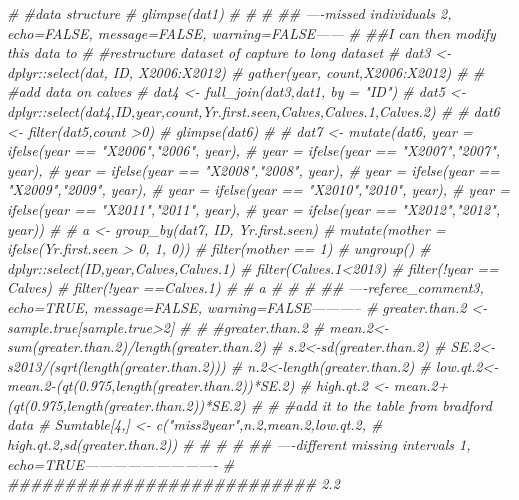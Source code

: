 \documentclass[]{book}
\newenvironment{Shaded}{\begin{snugshade}}{\end{snugshade}}
\newcommand{\CommentTok}[1]{\textcolor[rgb]{0.56,0.35,0.01}{\textit{#1}}}
\begin{document}
\begin{Shaded}
\begin{Highlighting}[]
{{{{{{{{{{\CommentTok{# #data structure}
\CommentTok{# glimpse(dat1)}
\CommentTok{# }
\CommentTok{# }
\CommentTok{# ## ----missed individuals 2, echo=FALSE, message=FALSE, warning=FALSE------}
\CommentTok{# ##I can then modify this data to}
\CommentTok{# #restructure dataset of capture to long dataset}
\CommentTok{# dat3 <- dplyr::select(dat, ID, X2006:X2012)%>%}
\CommentTok{#                gather(year, count,X2006:X2012)}
\CommentTok{# }
\CommentTok{# #add data on calves}
\CommentTok{# dat4 <- full_join(dat3,dat1, by = "ID")}
\CommentTok{# dat5 <- dplyr::select(dat4,ID,year,count,Yr.first.seen,Calves,Calves.1,Calves.2)}
\CommentTok{# }
\CommentTok{# dat6 <- filter(dat5,count >0)}
\CommentTok{# glimpse(dat6)}
\CommentTok{# }
\CommentTok{# dat7 <- mutate(dat6, year = ifelse(year == "X2006","2006", year),}
\CommentTok{#             year = ifelse(year == "X2007","2007", year),}
\CommentTok{#             year = ifelse(year == "X2008","2008", year),}
\CommentTok{#             year = ifelse(year == "X2009","2009", year),}
\CommentTok{#             year = ifelse(year == "X2010","2010", year),}
\CommentTok{#             year = ifelse(year == "X2011","2011", year),}
\CommentTok{#             year = ifelse(year == "X2012","2012", year))}
\CommentTok{# }
\CommentTok{# a <- group_by(dat7, ID, Yr.first.seen) %>%}
\CommentTok{#   mutate(mother = ifelse(Yr.first.seen > 0, 1, 0)) %>%}
\CommentTok{#   filter(mother == 1) %>%}
\CommentTok{#   ungroup() %>%}
\CommentTok{#   dplyr::select(ID,year,Calves,Calves.1) %>%}
\CommentTok{#   filter(Calves.1<2013) %>%}
\CommentTok{#   filter(!year == Calves) %>%}
\CommentTok{# filter(!year ==Calves.1)}
\CommentTok{# }
\CommentTok{# a}
\CommentTok{# }
\CommentTok{# }
\CommentTok{# ## ----referee_comment3, echo=TRUE, message=FALSE, warning=FALSE-----------}
\CommentTok{# greater.than.2 <- sample.true[sample.true>2]}
\CommentTok{# }
\CommentTok{# #greater.than.2}
\CommentTok{# mean.2<-sum(greater.than.2)/length(greater.than.2)}
\CommentTok{# s.2<-sd(greater.than.2)}
\CommentTok{# SE.2<-s2013/(sqrt(length(greater.than.2)))}
\CommentTok{# n.2<-length(greater.than.2)}
\CommentTok{# low.qt.2<- mean.2-(qt(0.975,length(greater.than.2))*SE.2)}
\CommentTok{# high.qt.2 <- mean.2+(qt(0.975,length(greater.than.2))*SE.2)}
\CommentTok{# }
\CommentTok{# #add it to the table from bradford data}
\CommentTok{# Sumtable[4,] <- c("miss2year",n.2,mean.2,low.qt.2,}
\CommentTok{#                   high.qt.2,sd(greater.than.2))}
\CommentTok{# }
\CommentTok{# }
\CommentTok{# }
\CommentTok{# ## ----different missing intervals 1, echo=TRUE----------------------------}
\CommentTok{# ########################### 2.2%}
}}}}}}}}}}}}}}}}}}}
\end{Highlighting}
\end{Shaded}
\end{document}

